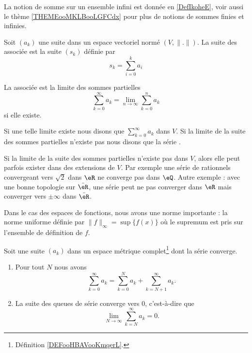 La notion de somme sur un ensemble infini est donnée en \ref{DefIkoheE}, voir aussi le thème \ref{THEMEooMKLBooLGFCdx} pour plus de notions de sommes finies et infinies.
\begin{definition}      \label{DefGFHAaOL}
	Soit \( (a_k)\) une suite dans un espace vectoriel normé \( (V,\| . \| )\). La suite des  associée est la suite \( (s_k)\) définie par
	\begin{equation}
		s_k=\sum_{i=0}^ka_i
	\end{equation}

    
	La  associée est la limite des sommes partielles
	\begin{equation}
		\sum_{k=0}^{\infty}a_k=\lim_{n\to \infty} \sum_{k=0}^na_k
	\end{equation}
	si elle existe.

	Si une telle limite existe nous disons que \( \sum_{k=0}^{\infty}a_k\)  dans \( V\). Si la limite de la suite des sommes partielles n'existe pas nous disons que la série .
\end{definition}

\begin{remark}
	Si la limite de la suite des sommes partielles n'existe pas dans \( V\), alors elle peut parfois exister dans des extensions de \( V\). Par exemple une série de rationnels convergeant vers \( \sqrt{2}\) dans \( \eR\) ne converge pas dans \( \eQ\). Autre exemple : avec une bonne topologie sur \( \bar \eR\), une série peut ne pas converger dans \( \eR\) mais converger vers \( \pm\infty\) dans \( \bar \eR\).
\end{remark}

Dans le cas des espaces de fonctions, nous avons une norme importante : la norme uniforme définie par \( \| f \|_{\infty}=\sup\{ f(x) \}\) où le supremum est pris sur l'ensemble de définition de \( f\).

\begin{lemma}       \label{LEMooHUZEooSyPipb}
	Soit une suite \( (a_k)\) dans un espace métrique complet\footnote{Définition \ref{DEFooHBAVooKmqerL}.} dont la série converge.

	\begin{enumerate}
		\item       \label{ITEMooPFSQooDhKFGL}
		      Pour tout \( N\) nous avons
		      \begin{equation}
			      \sum_{k=0}^{\infty}a_k=\sum_{k=0}^Na_k+\sum_{k=N+1}^{\infty}a_k.
		      \end{equation}
		\item       \label{ITEMooQNHMooUPjupB}
		      La suite des queues de série converge vers \( 0\), c'est-à-dire que
		      \begin{equation}
			      \lim_{N\to \infty} \sum_{k=N}^{\infty}a_k=0.
		      \end{equation}
	\end{enumerate}
\end{lemma}

